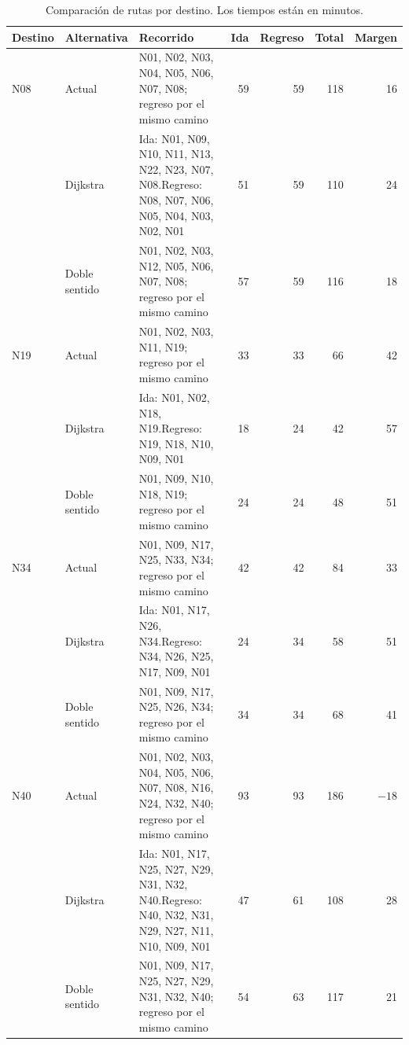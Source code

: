 \documentclass[11pt,letterpaper]{article}
\begin{document}
\begin{table}[htbp]
  \centering
  \footnotesize
  \caption{Comparación de rutas por destino. Los tiempos están en minutos.}
  \label{tab:rutas}
  \begin{tabularx}{\textwidth}{l l >{\raggedright\arraybackslash}X r r r r}
    \toprule
    Destino & Alternativa & Recorrido & Ida & Regreso & Total & Margen \\
    \midrule
    N08 & Actual & N01, N02, N03, N04, N05, N06, N07, N08; regreso por el mismo camino & 59 & 59 & 118 & 16 \\
        & Dijkstra & Ida: N01, N09, N10, N11, N13, N22, N23, N07, N08.\newline Regreso: N08, N07, N06, N05, N04, N03, N02, N01 & 51 & 59 & 110 & 24 \\
        & Doble sentido & N01, N02, N03, N12, N05, N06, N07, N08; regreso por el mismo camino & 57 & 59 & 116 & 18 \\
    \midrule
    N19 & Actual & N01, N02, N03, N11, N19; regreso por el mismo camino & 33 & 33 & 66 & 42 \\
        & Dijkstra & Ida: N01, N02, N18, N19.\newline Regreso: N19, N18, N10, N09, N01 & 18 & 24 & 42 & 57 \\
        & Doble sentido & N01, N09, N10, N18, N19; regreso por el mismo camino & 24 & 24 & 48 & 51 \\
    \midrule
    N34 & Actual & N01, N09, N17, N25, N33, N34; regreso por el mismo camino & 42 & 42 & 84 & 33 \\
        & Dijkstra & Ida: N01, N17, N26, N34.\newline Regreso: N34, N26, N25, N17, N09, N01 & 24 & 34 & 58 & 51 \\
        & Doble sentido & N01, N09, N17, N25, N26, N34; regreso por el mismo camino & 34 & 34 & 68 & 41 \\
    \midrule
    N40 & Actual & N01, N02, N03, N04, N05, N06, N07, N08, N16, N24, N32, N40; regreso por el mismo camino & 93 & 93 & 186 & $-18$ \\
        & Dijkstra & Ida: N01, N17, N25, N27, N29, N31, N32, N40.\newline Regreso: N40, N32, N31, N29, N27, N11, N10, N09, N01 & 47 & 61 & 108 & 28 \\
        & Doble sentido & N01, N09, N17, N25, N27, N29, N31, N32, N40; regreso por el mismo camino & 54 & 63 & 117 & 21 \\
    \bottomrule
  \end{tabularx}
\end{table}
\end{document}
